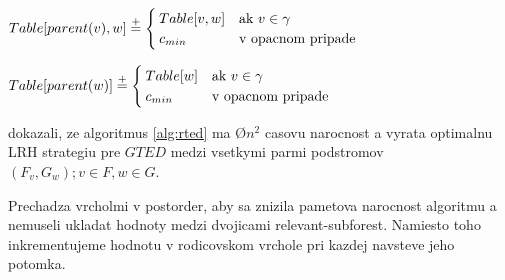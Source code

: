 \begin{algorithm}
\begin{algorithmic}[1]
  \item[]

      \State $Table[parent(v), w] \stackrel{+}{=}
        \begin{cases}
          Table[v, w] & \text{ak $v \in \gamma$}
          \\
          c_{min} & \text{v opacnom pripade}
        \end{cases}$
    \EndProcedure

      \State $Table[parent(w)] \stackrel{+}{=}
        \begin{cases}
          Table[w] & \text{ak $v \in \gamma$}
          \\
          c_{min} & \text{v opacnom pripade}
        \end{cases}$
    \EndProcedure
  \end{algorithmic}
\end{algorithm}

\citet{RTED} dokazali, ze algoritmus \ref{alg:rted} ma \O{$n^2$} casovu narocnost a vyrata optimalnu LRH
strategiu pre $GTED$ medzi vsetkymi parmi podstromov $(F_{v}, G_{w}); v \in F, w \in G$.

Prechadza vrcholmi v postorder, aby sa znizila pametova narocnost algoritmu a nemuseli ukladat hodnoty
medzi dvojicami relevant-subforest. Namiesto toho inkrementujeme hodnotu v rodicovskom vrchole pri
kazdej navsteve jeho potomka.





